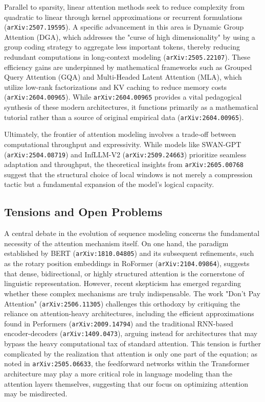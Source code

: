 \documentclass[11pt]{article}
\begin{document}
Parallel to sparsity, linear attention methods seek to reduce complexity from quadratic to linear through kernel approximations or recurrent formulations (\texttt{arXiv:2507.19595}). A specific advancement in this area is Dynamic Group Attention (DGA), which addresses the "curse of high dimensionality" by using a group coding strategy to aggregate less important tokens, thereby reducing redundant computations in long-context modeling (\texttt{arXiv:2505.22107}). These efficiency gains are underpinned by mathematical frameworks such as Grouped Query Attention (GQA) and Multi-Headed Latent Attention (MLA), which utilize low-rank factorizations and KV caching to reduce memory costs (\texttt{arXiv:2604.00965}). While \texttt{arXiv:2604.00965} provides a vital pedagogical synthesis of these modern architectures, it functions primarily as a mathematical tutorial rather than a source of original empirical data (\texttt{arXiv:2604.00965}).

Ultimately, the frontier of attention modeling involves a trade-off between computational throughput and expressivity. While models like SWAN-GPT (\texttt{arXiv:2504.08719}) and InfLLM-V2 (\texttt{arXiv:2509.24663}) prioritize seamless adaptation and throughput, the theoretical insights from \texttt{arXiv:2605.00768} suggest that the structural choice of local windows is not merely a compression tactic but a fundamental expansion of the model's logical capacity.

\subsection{Tensions and Open Problems}

A central debate in the evolution of sequence modeling concerns the fundamental necessity of the attention mechanism itself. On one hand, the paradigm established by BERT (\texttt{arXiv:1810.04805}) and its subsequent refinements, such as the rotary position embeddings in RoFormer (\texttt{arXiv:2104.09864}), suggests that dense, bidirectional, or highly structured attention is the cornerstone of linguistic representation. However, recent skepticism has emerged regarding whether these complex mechanisms are truly indispensable. The work "Don't Pay Attention" (\texttt{arXiv:2506.11305}) challenges this orthodoxy by critiquing the reliance on attention-heavy architectures, including the efficient approximations found in Performers (\texttt{arXiv:2009.14794}) and the traditional RNN-based encoder-decoders (\texttt{arXiv:1409.0473}), arguing instead for architectures that may bypass the heavy computational tax of standard attention. This tension is further complicated by the realization that attention is only one part of the equation; as noted in \texttt{arXiv:2505.06633}, the feedforward networks within the Transformer architecture may play a more critical role in language modeling than the attention layers themselves, suggesting that our focus on optimizing attention may be misdirected.
\end{document}
